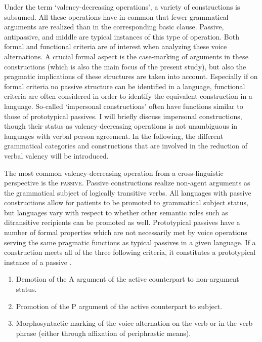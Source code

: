 Under the term `valency-decreasing operations', a variety of constructions is subsumed.  
All these operations have in common that fewer grammatical arguments are realized than in the corresponding basic clause. 
Passive, antipassive, and middle are typical instances of this type of operation.
Both formal and functional criteria are of interest when analyzing these voice alternations. 
A crucial formal aspect is the case-marking of arguments in these constructions (which is also the main focus of the present study), but also the pragmatic implications of these structures are taken into account. 
Especially if on formal criteria no passive structure can be identified in a language, functional criteria are often considered in order to identify the equivalent construction in a language. 
So-called `impersonal constructions' often have functions similar to those of prototypical passives. 
I will briefly discuss impersonal constructions, though their status as valency-decreasing operations is not unambiguous in languages with verbal person agreement. 
In the following, the different grammatical categories and constructions that are involved in the reduction of verbal valency will be introduced. 
 
The most common valency-decreasing operation from a cross-linguistic perspective is the \textsc{passive}. 
Passive constructions realize non-agent arguments as the grammatical subject of logically transitive verbs. 
All languages with passive constructions allow for patients to be promoted to grammatical subject status, but languages vary with respect to whether other semantic roles such as ditransitive recipients can be promoted as well. 
Prototypical {passives} have a number of formal properties which are not necessarily met by voice operations serving the same pragmatic functions as typical passives in a given language. 
If a construction meets all of the three following criteria, it constitutes a prototypical instance of a passive \citep[205]{WALS107, Payne:1997}.

\begin{enumerate}
\item Demotion of the A argument of the active counterpart to non-argument status.
\item Promotion of the P argument of the active counterpart to subject.
\item Morphosyntactic marking of the voice alternation on the verb or in the verb phrase (either through affixation of periphrastic means).
\end{enumerate}


